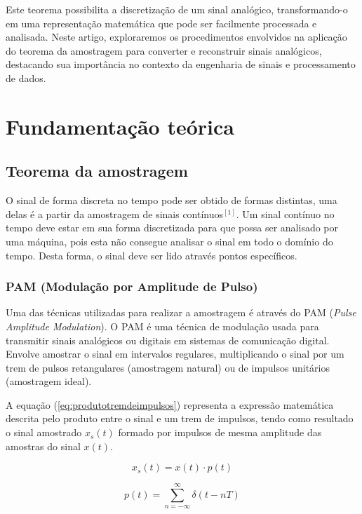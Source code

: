 \documentclass[]{IEEEtran}
\begin{document}
Este teorema possibilita a discretização de um sinal analógico, transformando-o em uma representação matemática que pode ser facilmente processada e analisada. Neste artigo, exploraremos os procedimentos envolvidos na aplicação do teorema da amostragem para converter e reconstruir sinais analógicos, destacando sua importância no contexto da engenharia de sinais e processamento de dados.

\section{Fundamentação teórica}

\subsection{Teorema da amostragem}

O sinal de forma discreta no tempo pode ser obtido de formas distintas, uma delas é a partir da amostragem de sinais contínuos$^{[1]}$. Um sinal contínuo no tempo deve estar em sua forma discretizada para que possa ser analisado por uma máquina, pois esta não consegue analisar o sinal em todo o domínio do tempo. Desta forma, o sinal deve ser lido através pontos específicos.

\subsubsection{PAM (Modulação por Amplitude de Pulso)}
Uma das técnicas utilizadas para realizar a amostragem é através do PAM (\textit{Pulse Amplitude Modulation}). O PAM é uma técnica de modulação usada para transmitir sinais analógicos ou digitais em sistemas de comunicação digital. Envolve amostrar o sinal em intervalos regulares, multiplicando o sinal por um trem de pulsos retangulares (amostragem natural) ou de impulsos unitários (amostragem ideal).

A equação (\ref{eq:produtotremdeimpulsos}) representa a expressão matemática descrita pelo produto entre o sinal e um trem de impulsos, tendo como resultado o sinal amostrado $x_{s}(t)$ formado por impulsos de mesma amplitude das amostras do sinal $x(t)$.

\begin{equation}\label{eq:produtotremdeimpulsos}
    x_{s}(t) = x(t) \cdot p(t)
\end{equation}

\begin{equation}\label{eq:tremdeimpulsos}
    p(t) = \sum_{n=-\infty}^{\infty} \delta(t - nT)
\end{equation}
\end{document}
